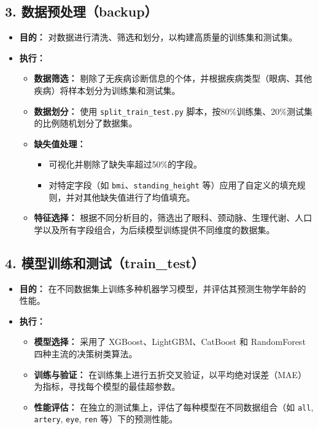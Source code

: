 \documentclass[UTF8]{report}
\theoremstyle{MyLineTheoremStyle} %
\theoremstyle{MyBlockTheoremStyle} %
\theoremstyle{MySubsubsectionStyle} %
\begin{document}
\subsection*{3. 数据预处理（backup）}
\begin{itemize}
    \item \textbf{目的：} 对数据进行清洗、筛选和划分，以构建高质量的训练集和测试集。
    \item \textbf{执行：}
    \begin{itemize}
        \item \textbf{数据筛选：} 剔除了无疾病诊断信息的个体，并根据疾病类型（眼病、其他疾病）将样本划分为训练集和测试集。
        \item \textbf{数据划分：} 使用 \texttt{split\_train\_test.py} 脚本，按80\%训练集、20\%测试集的比例随机划分了数据集。
        \item \textbf{缺失值处理：}
        \begin{itemize}
            \item 可视化并剔除了缺失率超过50\%的字段。
            \item 对特定字段（如 \texttt{bmi}、\texttt{standing\_height} 等）应用了自定义的填充规则，并对其他缺失值进行了均值填充。
        \end{itemize}
        \item \textbf{特征选择：} 根据不同分析目的，筛选出了眼科、颈动脉、生理代谢、人口学以及所有字段组合，为后续模型训练提供不同维度的数据集。
    \end{itemize}
\end{itemize}


\subsection*{4. 模型训练和测试（train\_test）}
\begin{itemize}
    \item \textbf{目的：} 在不同数据集上训练多种机器学习模型，并评估其预测生物学年龄的性能。
    \item \textbf{执行：}
    \begin{itemize}
        \item \textbf{模型选择：} 采用了 XGBoost、LightGBM、CatBoost 和 RandomForest 四种主流的决策树类算法。
        \item \textbf{训练与验证：} 在训练集上进行五折交叉验证，以平均绝对误差（MAE）为指标，寻找每个模型的最佳超参数。
        \item \textbf{性能评估：} 在独立的测试集上，评估了每种模型在不同数据组合（如 \texttt{all}, \texttt{artery}, \texttt{eye}, \texttt{ren} 等）下的预测性能。
    \end{itemize}
\end{itemize}
\end{document}
